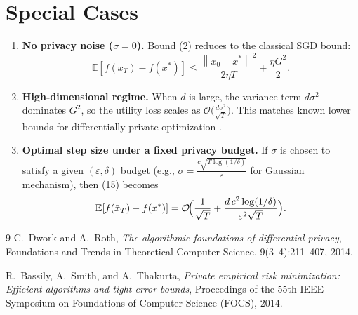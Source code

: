 \documentclass{article}
\newcommand{\EE}{\mathbb{E}}
\newcommand{\norm}[1]{\left\lVert #1 \right\rVert}
\begin{document}
\section*{Special Cases}
\begin{enumerate}
\item \textbf{No privacy noise ($\sigma=0$).}  
Bound (2) reduces to the classical SGD bound:
\[
\EE[f(\bar x_{T})-f(x^{\ast})]\le
\frac{\norm{x_{0}-x^{\ast}}^{2}}{2\eta T}
+\frac{\eta G^{2}}{2}.
\]

\item \textbf{High‑dimensional regime.}  
When $d$ is large, the variance term $d\sigma^{2}$ dominates $G^{2}$, so the utility loss scales as $\mathcal{O}\!\bigl(\tfrac{d\sigma^{2}}{\sqrt{T}}\bigr)$. This matches known lower bounds for differentially private optimization \cite{bassily2014private}.

\item \textbf{Optimal step size under a fixed privacy budget.}  
If $\sigma$ is chosen to satisfy a given $(\varepsilon,\delta)$ budget (e.g., $\sigma=\frac{c\sqrt{T\log(1/\delta)}}{\varepsilon}$ for Gaussian mechanism), then (15) becomes
\[
\EE[f(\bar x_{T})-f(x^{\ast})]
= \mathcal{O}\!\Bigl(\frac{1}{\sqrt{T}}+\frac{d\,c^{2}\log(1/\delta)}{\varepsilon^{2}\sqrt{T}}\Bigr).
\]
\end{enumerate}

\newpage
\begin{thebibliography}{9}
C.~Dwork and A.~Roth, \emph{The algorithmic foundations of differential privacy}, Foundations and Trends in Theoretical Computer Science, 9(3–4):211–407, 2014.

R.~Bassily, A.~Smith, and A.~Thakurta, \emph{Private empirical risk minimization: Efficient algorithms and tight error bounds}, Proceedings of the 55th IEEE Symposium on Foundations of Computer Science (FOCS), 2014.
\end{thebibliography}
\end{document}
